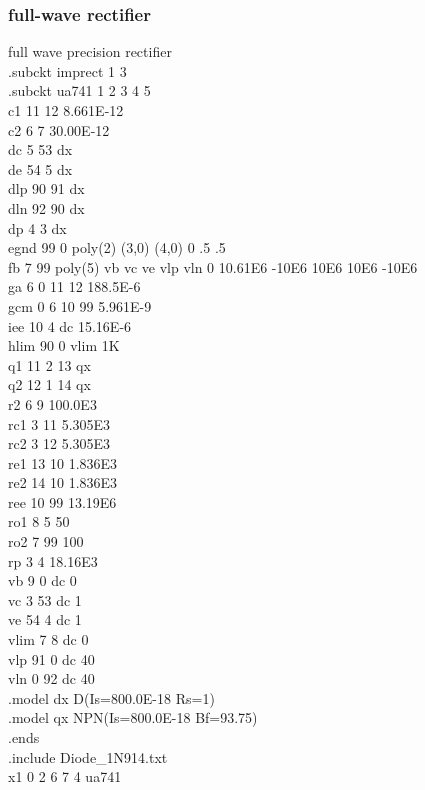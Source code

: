 \documentclass[12pt]{article}
\begin{document}
\subsubsection{full-wave rectifier}
full wave precision rectifier\\
.subckt imprect 1 3 \\
.subckt ua741    1  2  3  4  5\\
c1   11 12 8.661E-12\\
c2    6  7 30.00E-12\\
dc    5 53 dx\\
de   54  5 dx\\
dlp  90 91 dx\\
dln  92 90 dx\\
dp    4  3 dx\\
egnd 99  0 poly(2) (3,0) (4,0) 0 .5 .5\\
fb    7 99 poly(5) vb vc ve vlp vln 0 10.61E6 -10E6 10E6 10E6 -10E6\\
ga    6  0 11 12 188.5E-6\\
gcm   0  6 10 99 5.961E-9\\
iee  10  4 dc 15.16E-6\\
hlim 90  0 vlim 1K\\
q1   11  2 13 qx\\
q2   12  1 14 qx\\
r2    6  9 100.0E3\\
rc1   3 11 5.305E3\\
\newpage
rc2   3 12 5.305E3\\
re1  13 10 1.836E3\\
re2  14 10 1.836E3\\
ree  10 99 13.19E6\\
ro1   8  5 50\\
ro2   7 99 100\\
rp    3  4 18.16E3\\
vb    9  0 dc 0\\
vc    3 53 dc 1\\
ve   54  4 dc 1\\
vlim  7  8 dc 0\\
vlp  91  0 dc 40\\
vln   0 92 dc 40\\
.model dx D(Is=800.0E-18 Rs=1)\\
.model qx NPN(Is=800.0E-18 Bf=93.75)\\
.ends\\
.include Diode\_1N914.txt\\
x1 0 2  6 7 4 ua741\\
\end{document}
